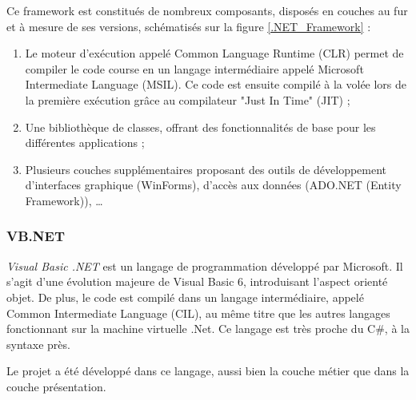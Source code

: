 Ce framework est constitués de nombreux composants, disposés en couches au fur et à mesure de ses versions, schématisés sur la figure \ref{.NET_Framework} :
\begin{enumerate}
	\item Le moteur d'exécution appelé Common Language Runtime (CLR) permet de compiler le code course en un langage intermédiaire appelé Microsoft Intermediate Language (MSIL). Ce code est ensuite compilé à la volée lors de la première exécution grâce au compilateur "Just In Time" (JIT) ;
	\item Une bibliothèque de classes, offrant des fonctionnalités de base pour les différentes applications ;
	\item Plusieurs couches supplémentaires proposant des outils de développement d'interfaces graphique (WinForms), d'accès aux données (ADO.NET (Entity Framework)), \ldots
\end{enumerate}


\subsubsection{VB.NET}

\textit{Visual Basic .NET} est un langage de programmation développé par Microsoft. Il s'agit d'une évolution majeure de Visual Basic 6, introduisant l'aspect orienté objet. De plus, le code est compilé dans un langage intermédiaire, appelé Common Intermediate Language (CIL), au même titre que les autres langages fonctionnant sur la machine virtuelle .Net. Ce langage est très proche du C\#, à la syntaxe près.

Le projet a été développé dans ce langage, aussi bien la couche métier que dans la couche présentation.


